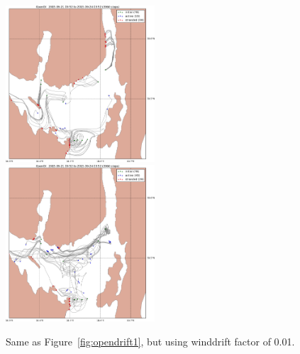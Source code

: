 \documentclass[12pt,a4paper,english]{article}
\begin{document}
\begin{figure}[ht]
\centerline{
\includegraphics*[width=0.495\textwidth]{Opendrift_simulations/LTR3/tokt_drifters_winddrift_0p1_radius_0_num_6_plusminus_2p5h_crop}
\includegraphics*[width=0.495\textwidth]{Opendrift_simulations/LTR3/tokt_drifters_winddrift_0p1_radius_0_num_6_plusminus_2p5h_norkyst_crop}
}
\caption{\small
Same as Figure~\ref{fig:opendrift1}, but using winddrift factor of 0.01.
}
\label{fig:opendrift2}
\end{figure}
\end{document}
